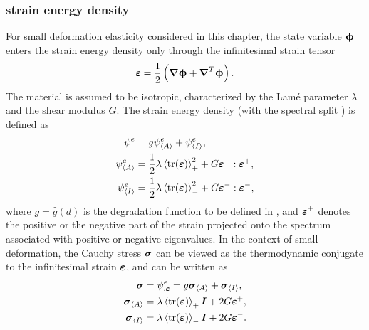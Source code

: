 \subsubsection{strain energy density}

For small deformation elasticity considered in this chapter, the state variable $\boldsymbol{\upphi}$ enters the strain energy density only through the infinitesimal strain tensor
\begin{align}
  \boldsymbol{\varepsilon} = \dfrac{1}{2}\left( \boldsymbol{\nabla} \boldsymbol{\upphi} + \boldsymbol{\nabla}^T \boldsymbol{\upphi} \right).
\end{align}
The material is assumed to be isotropic, characterized by the Lam\'{e} parameter $\lambda$ and the shear modulus $G$. The strain energy density (with the spectral split \cite{miehe_2010_p1, miehe_2010_p2}) is defined as
\begin{subequations}
  \begin{align}
    \psi^e               & = g \psi^e_{\left< A \right>} + \psi^e_{\left< I \right>},                              \label{eq: chapter 3 strain energy density} \\
    \psi^e_{\left< A \right>}   & = \dfrac{1}{2} \lambda \left<\operatorname{tr}(\boldsymbol{\varepsilon})\right>_+^2 + G \boldsymbol{\varepsilon}^+:\boldsymbol{\varepsilon}^+,                                             \\
    \psi^e_{\left< I \right>} & = \dfrac{1}{2} \lambda \left<\operatorname{tr}(\boldsymbol{\varepsilon})\right>_-^2 + G \boldsymbol{\varepsilon}^-:\boldsymbol{\varepsilon}^-,                                             
  \end{align}
\end{subequations}
where $g = \hat{g}(d)$ is the degradation function to be defined in , and $\boldsymbol{\varepsilon}^\pm$ denotes the positive or the negative part of the strain projected onto the spectrum associated with positive or negative eigenvalues. In the context of small deformation, the Cauchy stress $\boldsymbol{\sigma}$ can be viewed as the thermodynamic conjugate to the infinitesimal strain $\boldsymbol{\varepsilon}$, and can be written as
\begin{subequations}
  \begin{align}
    \boldsymbol{\sigma}               & = \psi^e_{,\boldsymbol{\varepsilon}} = g \boldsymbol{\sigma}_{\left< A \right>} + \boldsymbol{\sigma}_{\left< I \right>}, \label{eq: chapter 3 stress strain relation} \\
    \boldsymbol{\sigma}_{\left< A \right>}   & = \lambda \left<\operatorname{tr}(\boldsymbol{\varepsilon})\right>_+ \boldsymbol{I} + 2 G \boldsymbol{\varepsilon}^+,                                                         \\
    \boldsymbol{\sigma}_{\left< I \right>} & = \lambda \left<\operatorname{tr}(\boldsymbol{\varepsilon})\right>_- \boldsymbol{I} + 2 G \boldsymbol{\varepsilon}^-.                                                         
  \end{align}
\end{subequations}

